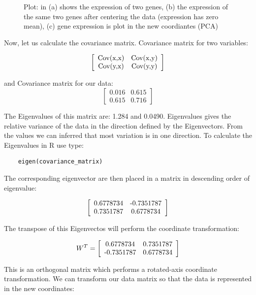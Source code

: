 \documentclass[11pt, oneside]{article}   	%
\begin{document}
\begin{figure}[!ht]
\begin{subfigure}{0.45\textwidth}
		\caption{}
		\label{fig:PlotTwoGenesNewCoordiantes}
	\end{subfigure}
	\caption{Plot: in (a) shows the expression of two genes, (b) the expression of the same two genes after centering the data (expression has zero mean),  (c) gene expression is plot in the new coordiantes (PCA)}
	\label{fig:PlotData}
\end{figure}


Now, let us calculate the covariance matrix. Covariance matrix for two variables:

\[ \left[ \begin{array}{cc}
      $Cov(x,x)$ & $Cov(x,y)$\\ 
      $Cov(y,x)$ & $Cov(y,y)$
      \end{array} \right]
\]

\noindent and Covariance matrix for our data:
\[
   \left[ \begin{array}{cc}
      0.016 & 0.615 \\ 
      0.615 & 0.716
      \end{array} \right]
\]

The Eigenvalues of this matrix are:  1.284 and 0.0490. Eigenvalues gives the relative variance of the data in the direction defined by the Eigenvectors. From the values we can inferred that most variation is in one direction. To calculate the Eigenvalues in R use type:

\begin{framed}
\begin{verbatim}
	eigen(covariance_matrix)
\end{verbatim}
\end{framed}

The corresponding eigenvector are then placed in a matrix in descending order of eigenvalue:

\[
   \left[ \begin{array}{cc}
	0.6778734 & $-0.7351787$ \\
	0.7351787 & 0.6778734
      \end{array} \right]
\]

The transpose of this Eigenvectos will perform the coordinate transformation:

\[
   W^T = 
   \left[ \begin{array}{cc}
	0.6778734 & 0.7351787 \\
	$-0.7351787$ & 0.6778734
      \end{array} \right]
\]

\noindent This is an orthogonal matrix which performs a rotated-axis coordinate transformation.
We can transform our data matrix so that the data is represented in the new coordinates:  
\end{document}
